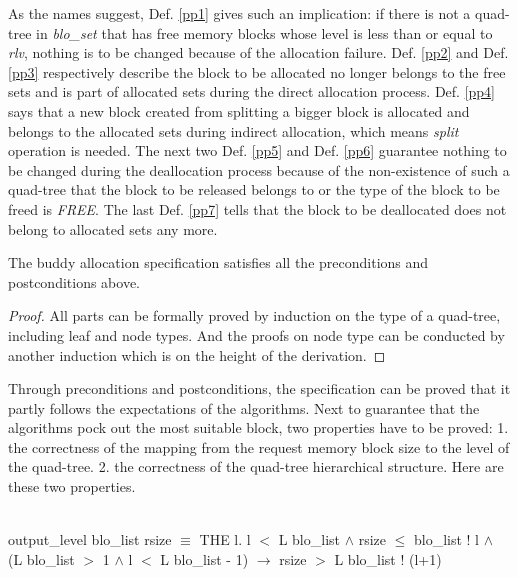 \documentclass[runningheads]{llncs}
\begin{document}
As the names suggest, Def. \ref{pp1} gives such an implication: if there is not a quad-tree in \emph{blo\_set} that has free memory blocks whose level is less than or equal to \emph{rlv}, nothing is to be changed because of the allocation failure. Def. \ref{pp2} and Def. \ref{pp3} respectively describe the block to be allocated no longer belongs to the free sets and is part of allocated sets during the direct allocation process. Def. \ref{pp4} says that a new block created from splitting a bigger block is allocated and belongs to the allocated sets during indirect allocation, which means \emph{split} operation is needed. The next two Def. \ref{pp5} and Def. \ref{pp6} guarantee nothing to be changed during the deallocation process because of the non-existence of such a quad-tree that the block to be released belongs to or the type of the block to be freed is \emph{FREE}. The last Def. \ref{pp7} tells that the block to be deallocated does not belong to allocated sets any more.

\begin{theorem}
The buddy allocation specification satisfies all the preconditions and postconditions above.
\end{theorem}

\begin{proof}
All parts can be formally proved by induction on the type of a quad-tree, including leaf and node types. And the proofs on node type can be conducted by another induction which is on the height of the derivation.
\end{proof}

Through preconditions and postconditions, the specification can be proved that it partly follows the expectations of the algorithms. Next to guarantee that the algorithms pock out the most suitable block, two properties have to be proved: 1. the correctness of the mapping from the request memory block size to the level of the quad-tree. 2. the correctness of the quad-tree hierarchical  structure. Here are these two properties.

\begin{definition}  \\
output\_level blo\_list rsize $\equiv$ THE l. l $<$ L blo\_list $\wedge$ rsize $\le$ blo\_list ! l $\wedge$ \\
\phantom{x} \hspace{10pt} (L blo\_list $>$ 1 $\wedge$ l $<$ L blo\_list - 1) $\longrightarrow$ rsize $>$ L blo\_list ! (l+1)
\end{definition}
\end{document}
